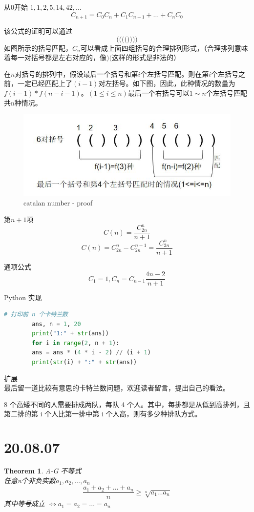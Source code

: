 \documentclass[10pt,a4paper]{book}
\newtheorem{theorem}{Theorem}[section]
\begin{document}
	从0开始 $ 1, 1, 2, 5, 14, 42, \dots $
	\[
	C_{n+1} = C_0 C_n + C_1 C_{n-1} + \dots + C_n C_0
	\]
	
	该公式的证明可以通过
	\[
	\Bigg( \bigg( \Big( \big( \Bigg) \bigg) \Big) \big)
	\]
	如图所示的括号匹配，$ C_n $可以看成上面四组括号的合理排列形式，（合理排列意味着每一对括号都是左右对应的，像$ )( $这样的形式是非法的）
	
	在$ n $对括号的排列中，假设最后一个括号和第$ i $个左括号匹配。则在第$ i $个左括号之前，一定已经匹配上了$ (i-1) $对左括号。如下图，因此，此种情况的数量为$ f(i-1)*f(n-i-1) $。$ (1\leq i\leq n) $最后一个右括号可以$ 1 \sim n $个左括号匹配共n种情况。
	
	\begin{figure} [h]
		\centering
		\includegraphics[width=0.7\linewidth]{pic/catalan_proof-001}
		\caption{catalan number - proof}
		\label{fig:catalanproof-001}
	\end{figure}
	
	
	第$ n+1 $项 
	\[C(n) = \frac{C^n_{2n}}{n+1} \]
	\[	C(n) = C_{2n}^n-C_{2n}^{n-1} = \frac{C_{2n}^n}{n+1}	\]
	
	通项公式
	\[ C_1 = 1, C_n = C_{n-1}\frac{4n-2}{n+1} \]
	
	
	Python 实现
	
	
	\begin{lstlisting}[language=Python]
		# 打印前 n 个卡特兰数
		ans, n = 1, 20
		print("1:" + str(ans))
		for i in range(2, n + 1):
		ans = ans * (4 * i - 2) // (i + 1)
		print(str(i) + ":" + str(ans))
	\end{lstlisting}
	
	
	扩展\\
	
	最后留一道比较有意思的卡特兰数问题，欢迎读者留言，提出自己的看法。
	
	8 个高矮不同的人需要排成两队，每队 4 个人。其中，每排都是从低到高排列，且第二排的第 i 个人比第一排中第 i 个人高，则有多少种排队方式。
	
	
	
	\section{20.08.07}
	\begin{theorem}
	A-G 不等式\\ 任意n个非负实数$ a_1, a_2, \dots, a_n$ \\
	\begin{equation}
		\frac{a_1 + a_2 + \dots + a_n}{n} \geq \sqrt[n]{a_1\dots a_n}
	\end{equation}
	其中等号成立 $\iff a_1 = a_2 = \dots = a_n$

	\label{thm-1}
	\end{theorem}
\end{document}
